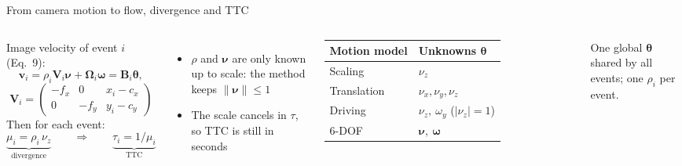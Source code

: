 \documentclass[aspectratio=169,10pt]{beamer}
\begin{document}
\begin{frame}{From camera motion to flow, divergence and TTC}
  \begin{columns}[T,onlytextwidth]
    Image velocity of event $i$ (Eq.~9):
    \[
      \mathbf v_i=\rho_i\mathbf V_i\bm\nu+\bm\Omega_i\bm\omega=\mathbf B_i\bm\theta,
    \]
    \[
      \mathbf V_i=\begin{pmatrix}-f_x&0&x_i-c_x\\0&-f_y&y_i-c_y\end{pmatrix}
    \]
    Then for each event:
    \[
      \underbrace{\mu_i=\rho_i\,\nu_z}_{\text{divergence}}
      \qquad\Rightarrow\qquad
      \underbrace{\tau_i=1/\mu_i}_{\text{TTC}}
    \]
    \begin{itemize}\small
      \item $\rho$ and $\bm\nu$ are only known \alert{up to scale}: the method keeps $\|\bm\nu\|\le 1$
      \item The scale cancels in $\tau$, so TTC is still in \alert{seconds}
    \end{itemize}
    \small
    \begin{tabular}{@{}ll@{}}
      \toprule
      Motion model & Unknowns $\bm\theta$ \\
      \midrule
      Scaling & $\nu_z$ \\
      Translation & $\nu_x,\nu_y,\nu_z$ \\
      Driving & $\nu_z,\ \omega_y$ \;($|\nu_z|=1$) \\
      6-DOF & $\bm\nu,\ \bm\omega$ \\
      \bottomrule
    \end{tabular}

    \vspace{3mm}
    \footnotesize One global $\bm\theta$ shared by all events; one $\rho_i$ per event.
  \end{columns}
\end{frame}
\end{document}
